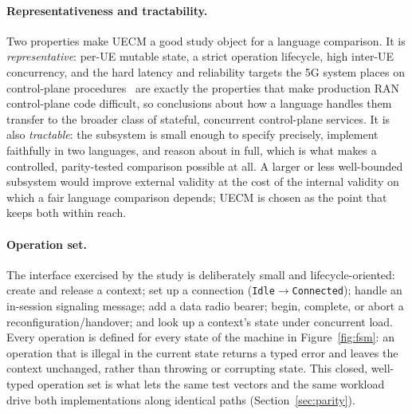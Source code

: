 \documentclass[english,twoside,openright,a4paper,censored,csm,software-track-2020]{HYthesisML}
\begin{document}
\paragraph{Representativeness and tractability.}
Two properties make UECM a good study object for a language comparison. It is
\emph{representative}: per-UE mutable state, a strict operation lifecycle, high inter-UE
concurrency, and the hard latency and reliability targets the 5G system places on control-plane
procedures~\cite{3gpp22261} are exactly the properties that make production
RAN control-plane code difficult, so conclusions about how a language handles them transfer to
the broader class of stateful, concurrent control-plane services. It is also \emph{tractable}:
the subsystem is small enough to specify precisely, implement faithfully in two languages, and
reason about in full, which is what makes a controlled, parity-tested comparison possible at
all. A larger or less well-bounded subsystem would improve external validity at the cost of the
internal validity on which a fair language comparison depends; UECM is chosen as the point that
keeps both within reach.

\paragraph{Operation set.}
The interface exercised by the study is deliberately small and lifecycle-oriented: create and
release a context; set up a connection (\texttt{Idle}$\rightarrow$\texttt{Connected}); handle an
in-session signaling message; add a data radio bearer; begin, complete, or abort a
reconfiguration/handover; and look up a context's state under concurrent load. Every operation is
defined for every state of the machine in Figure~\ref{fig:fsm}: an operation that is illegal in
the current state returns a typed error and leaves the context unchanged, rather than throwing
or corrupting state. This closed, well-typed operation set is what lets the same test vectors
and the same workload drive both implementations along identical paths
(Section~\ref{sec:parity}).
\end{document}
